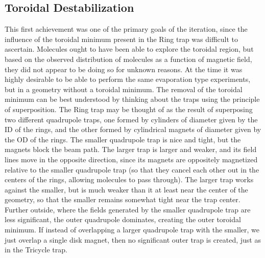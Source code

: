 \subsection{Toroidal Destabilization}

This first achievement was one of the primary goals of the iteration, since the influence of the toroidal minimum present in the Ring trap was difficult to ascertain. 
Molecules ought to have been able to explore the toroidal region, but based on the observed distribution of molecules as a function of magnetic field, they did not appear to be doing so for unknown reasons.
At the time it was highly desirable to be able to perform the same evaporation type experiments, but in a geometry without a toroidal minimum.
The removal of the toroidal minimum can be best understood by thinking about the traps using the principle of superposition.
The Ring trap may be thought of as the result of superposing two different quadrupole traps, one formed by cylinders of diameter given by the ID of the rings, and the other formed by cylindrical magnets of diameter given by the OD of the rings.
The smaller quadrupole trap is nice and tight, but the magnets block the beam path.
The larger trap is larger and weaker, and its field lines move in the opposite direction, since its magnets are oppositely magnetized relative to the smaller quadrupole trap (so that they cancel each other out in the centers of the rings, allowing molecules to pass through).
The larger trap works against the smaller, but is much weaker than it at least near the center of the geometry, so that the smaller remains somewhat tight near the trap center.
Further outside, where the fields generated by the smaller quadrupole trap are less significant, the outer quadrupole dominates, creating the outer toroidal minimum.
If instead of overlapping a larger quadrupole trap with the smaller, we just overlap a single disk magnet, then no significant outer trap is created, just as in the Tricycle trap.

